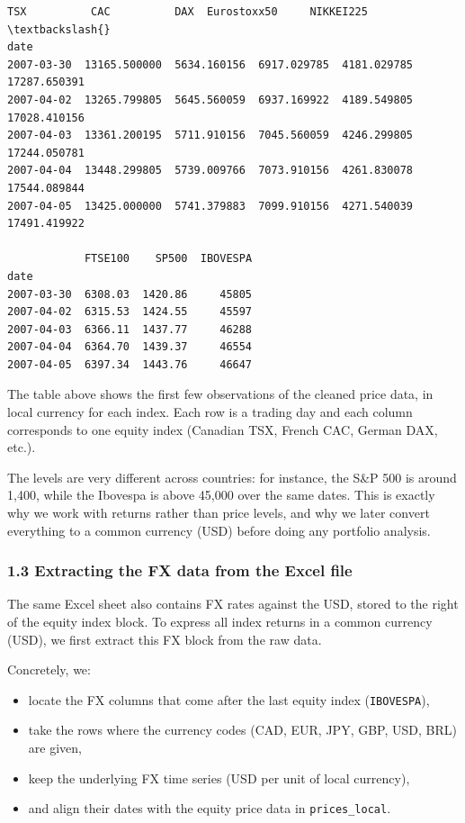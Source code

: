 \documentclass[11pt]{article}
\begin{document}
            \begin{tcolorbox}[breakable, size=fbox, boxrule=.5pt, pad at break*=1mm, opacityfill=0]
\begin{Verbatim}[commandchars=\\\{\}]
                     TSX          CAC          DAX  Eurostoxx50     NIKKEI225  \textbackslash{}
date
2007-03-30  13165.500000  5634.160156  6917.029785  4181.029785  17287.650391
2007-04-02  13265.799805  5645.560059  6937.169922  4189.549805  17028.410156
2007-04-03  13361.200195  5711.910156  7045.560059  4246.299805  17244.050781
2007-04-04  13448.299805  5739.009766  7073.910156  4261.830078  17544.089844
2007-04-05  13425.000000  5741.379883  7099.910156  4271.540039  17491.419922

            FTSE100    SP500  IBOVESPA
date
2007-03-30  6308.03  1420.86     45805
2007-04-02  6315.53  1424.55     45597
2007-04-03  6366.11  1437.77     46288
2007-04-04  6364.70  1439.37     46554
2007-04-05  6397.34  1443.76     46647
\end{Verbatim}
\end{tcolorbox}
        
    The table above shows the first few observations of the cleaned price
data, in local currency for each index. Each row is a trading day and
each column corresponds to one equity index (Canadian TSX, French CAC,
German DAX, etc.).

The levels are very different across countries: for instance, the S\&P
500 is around 1,400, while the Ibovespa is above 45,000 over the same
dates. This is exactly why we work with returns rather than price
levels, and why we later convert everything to a common currency (USD)
before doing any portfolio analysis.

    \hypertarget{extracting-the-fx-data-from-the-excel-file}{%
\subsubsection{1.3 Extracting the FX data from the Excel
file}\label{extracting-the-fx-data-from-the-excel-file}}

The same Excel sheet also contains FX rates against the USD, stored to
the right of the equity index block. To express all index returns in a
common currency (USD), we first extract this FX block from the raw data.

Concretely, we:

\begin{itemize}
    \item locate the FX columns that come after the last equity index (\texttt{IBOVESPA}),
    \item take the rows where the currency codes (CAD, EUR, JPY, GBP, USD, BRL) are given,
    \item keep the underlying FX time series (USD per unit of local currency),
    \item and align their dates with the equity price data in \texttt{prices\_local}.
\end{itemize}
\end{document}
